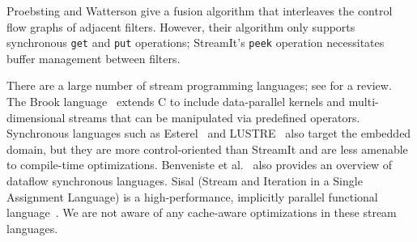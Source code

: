 Proebsting and Watterson \cite{pro96} give a fusion algorithm that
interleaves the control flow graphs of adjacent filters.  However,
their algorithm only supports synchronous {\tt get} and {\tt put}
operations; StreamIt's {\tt peek} operation necessitates buffer
management between filters.

There are a large number of stream programming languages; see
\cite{survey97} for a review.  The Brook language~\cite{Buck04}
extends C to include data-parallel kernels and multi-dimensional
streams that can be manipulated via predefined operators.  Synchronous
languages such as Esterel~\cite{esterel92} and LUSTRE~\cite{lustre}
also target the embedded domain, but they are more control-oriented
than StreamIt and are less amenable to compile-time optimizations.
Benveniste et al.~\cite{benveniste93dataflow} also provides an
overview of dataflow synchronous languages.  Sisal (Stream and
Iteration in a Single Assignment Language) is a high-performance,
implicitly parallel functional language~\cite{sisal}.  We are not
aware of any cache-aware optimizations in these stream languages.

